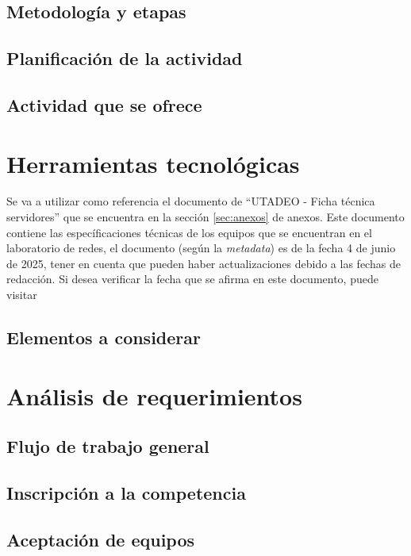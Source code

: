 \documentclass{article}
\begin{document}
\subsection{Metodología y etapas}




\subsection{Planificación de la actividad}

\subsection{Actividad que se ofrece}

\section{Herramientas tecnológicas}

Se va a utilizar como referencia el documento de ``UTADEO - Ficha técnica servidores'' que se encuentra en la sección \ref{sec:anexos} de anexos. Este documento contiene las específicaciones técnicas de los equipos que se encuentran en el laboratorio de redes, el documento (según la \textit{metadata}) es de la fecha 4 de junio de 2025, tener en cuenta que pueden haber actualizaciones debido a las fechas de redacción. Si desea verificar la fecha que se afirma en este documento, puede visitar


\subsection{Elementos a considerar}

\section{Análisis de requerimientos}

\subsection{Flujo de trabajo general}

\subsection{Inscripción a la competencia}

\subsection{Aceptación de equipos}
\end{document}
